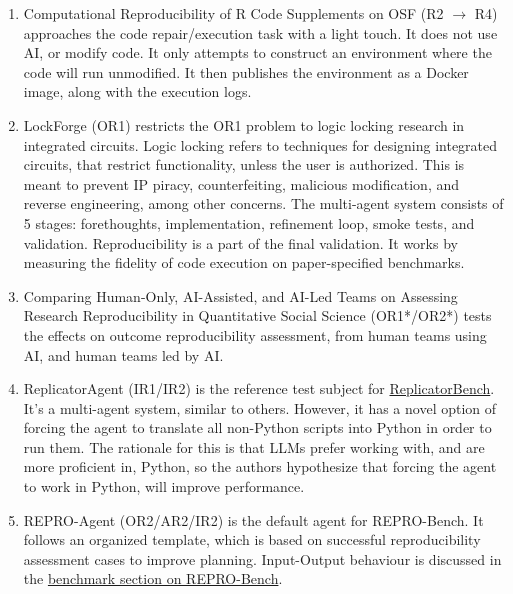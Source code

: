 \documentclass[8pt,a4paper]{article}
\begin{document}
\begin{enumerate}
        The agent workflow uses commercial off the shelf coding agents, specifically OpenCode\cite{opencode} and Claude Code\cite{claudecode}.
    \item Computational Reproducibility of R Code Supplements on OSF\cite{saju2025} (R2 $\rightarrow$ R4)
        \subitem approaches the code repair/execution task with a light touch. It does not use AI, or modify code.
        It only attempts to construct an environment where the code will run unmodified.
        It then publishes the environment as a Docker image, along with the execution logs.
    \item LockForge\cite{lockforge} (OR1)
        \subitem restricts the OR1 problem to logic locking research in integrated circuits.
        Logic locking refers to techniques for designing integrated circuits, that restrict functionality, 
        unless the user is authorized. This is meant to prevent IP piracy, counterfeiting, malicious modification, 
        and reverse engineering, among other concerns.
        The multi-agent system consists of 5 stages: forethoughts, implementation, refinement loop, smoke tests, and validation.
        Reproducibility is a part of the final validation. It works by measuring the fidelity of code execution on paper-specified benchmarks.
    \item Comparing Human-Only, AI-Assisted, and AI-Led Teams on Assessing Research Reproducibility in Quantitative Social Science\cite{bensch2025} (OR1*/OR2*)
        \subitem tests the effects on outcome reproducibility assessment, from human teams using AI, and human teams led by AI.
    \item ReplicatorAgent\cite[pages~5--6]{replicatorbench} (IR1/IR2)
        \subitem is the reference test subject for \hyperref[itm:replicatorbenchdesc]{ReplicatorBench}\cite{replicatorbench}.
        It's a multi-agent system, similar to others.
        However, it has a novel option of forcing the agent to translate all non-Python scripts into Python in order to run them.
        The rationale for this is that LLMs prefer working with, and are more proficient in, Python\cite{twist2026},
        so the authors hypothesize that forcing the agent to work in Python, will improve performance.
    \item REPRO-Agent\cite[page~9]{reprobench} (OR2/AR2/IR2)
        \subitem is the default agent for REPRO-Bench\cite{reprobench}.
        It follows an organized template, which is based on successful reproducibility assessment cases to improve planning.
        Input-Output behaviour is discussed in the \hyperref[itm:reprobenchatbenchmarks]{benchmark section on REPRO-Bench}.

\end{enumerate}
\end{document}
